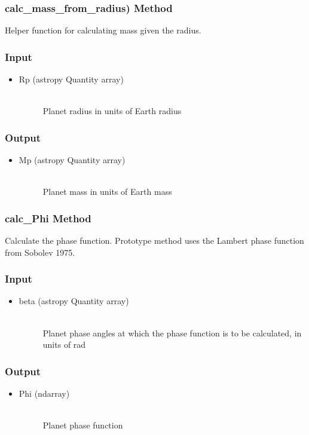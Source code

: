 \documentclass[cleanfoot]{asme2ej}
\begin{document}
\subsubsection{calc\_mass\_from\_radius) Method} \label{sec:calcmassfromradiustask}
Helper function for calculating mass given the radius.
\subsubsection*{Input}
\begin{itemize}
\item
\begin{description}
    \item[Rp (astropy Quantity array)] \hfill \\ Planet radius in units of Earth radius
\end{description}
\end{itemize}
\subsubsection*{Output}
\begin{itemize}
\item
\begin{description}
    \item[Mp (astropy Quantity array)] \hfill \\ Planet mass in units of Earth mass
\end{description}
\end{itemize}

\subsubsection{calc\_Phi Method} \label{sec:calcphitask}
Calculate the phase function. Prototype method uses the Lambert phase function from Sobolev 1975.
\subsubsection*{Input}
\begin{itemize}
\item
\begin{description}
    \item[beta (astropy Quantity array)] \hfill \\ Planet phase angles at which the phase function is to be calculated, in units of rad
\end{description}
\end{itemize}
\subsubsection*{Output}
\begin{itemize}
\item
\begin{description}
    \item[Phi (ndarray)] \hfill \\ Planet phase function
\end{description}
\end{itemize}
\end{document}

